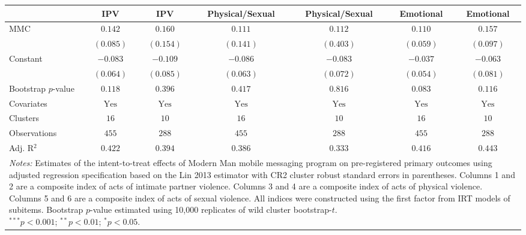 
\begin{tabular}{l c c c c c c}
\toprule
 & IPV & IPV & Physical/Sexual & Physical/Sexual & Emotional & Emotional \\
\midrule
MMC                 & $0.142$        & $0.160$        & $0.111$        & $0.112$        & $0.110$        & $0.157$        \\
                    & $(0.085)$      & $(0.154)$      & $(0.141)$      & $(0.403)$      & $(0.059)$      & $(0.097)$      \\
Constant            & $-0.083$       & $-0.109$       & $-0.086$       & $-0.083$       & $-0.037$       & $-0.063$       \\
                    & $(0.064)$      & $(0.085)$      & $(0.063)$      & $(0.072)$      & $(0.054)$      & $(0.081)$      \\
\midrule
Bootstrap $p$-value & $0.118$        & $0.396$        & $0.417$        & $0.816$        & $0.083$        & $0.116$        \\
Covariates          & $\textrm{Yes}$ & $\textrm{Yes}$ & $\textrm{Yes}$ & $\textrm{Yes}$ & $\textrm{Yes}$ & $\textrm{Yes}$ \\
Clusters            & $16$           & $10$           & $16$           & $10$           & $16$           & $10$           \\
Observations        & $455$          & $288$          & $455$          & $288$          & $455$          & $288$          \\
Adj. R$^2$          & $0.422$        & $0.394$        & $0.386$        & $0.333$        & $0.416$        & $0.443$        \\
\bottomrule
\multicolumn{7}{l}{\scriptsize{\parbox{\linewidth}{\vspace{2pt} 
       \textit{Notes:} Estimates of the intent-to-treat effects of Modern Man mobile 
       messaging program on pre-registered primary outcomes using adjusted regression 
       specification based on the Lin 2013 estimator with CR2 cluster robust 
       standard errors in parentheses. Columns 1 and 2 are a composite index of 
       acts of intimate partner violence. Columns 3 and 4 are a composite index of acts
       of physical violence. Columns 5 and 6 are a composite index of acts of sexual violence.
       All indices were constructed using the first factor from IRT models of subitems. 
       Bootstrap $p$-value estimated using 10,000 replicates of wild cluster bootstrap-$t$. \\ $^{***}p<0.001$; $^{**}p<0.01$; $^{*}p<0.05$.}}}
\end{tabular}
